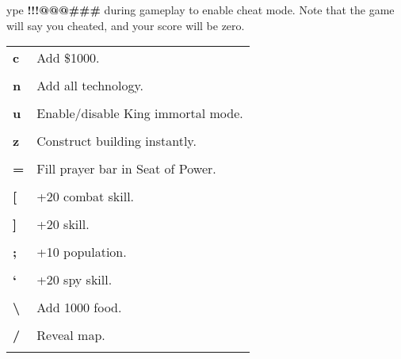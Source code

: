 

ype \textbf{!!!@@@\#\#\#} during gameplay to enable cheat mode. Note that the game will say you cheated, and your score will be zero. \\ %

\begin{tabular}{p{1in} p{3in}}    
    \textbf{c} & Add \$1000. \\ \\        
    \textbf{n} & Add all technology.\\ \\        
    \textbf{u} & Enable/disable King immortal mode.\\ \\        
    \textbf{z} & Construct building instantly.\\ \\        
    \textbf{=} & Fill prayer bar in Seat of Power.\\ \\        
    \textbf{[} & +20 combat skill.\\ \\        
    \textbf{]} & +20 skill.\\ \\        
    \textbf{;} & +10 population.\\ \\        
    \textbf{‘} & +20 spy skill.\\ \\        
    \textbf{\textbackslash} & Add 1000 food.\\ \\        
    \textbf{/} & Reveal map.\\ \\
\end{tabular}
